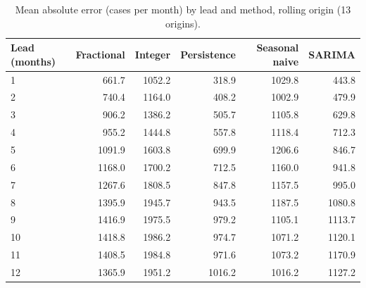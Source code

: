 \begin{table}[htbp]
\centering
\small
\caption{Mean absolute error (cases per month) by lead and method, rolling origin (13 origins).}
\label{tab:mae_h}
\begingroup\setlength{\tabcolsep}{6pt}
\begin{tabular}{@{}lrrrrr@{}}
\toprule
Lead (months) & Fractional & Integer & Persistence & Seasonal naive & SARIMA \\
\midrule
1 & 661.7 & 1052.2 & 318.9 & 1029.8 & 443.8 \\
2 & 740.4 & 1164.0 & 408.2 & 1002.9 & 479.9 \\
3 & 906.2 & 1386.2 & 505.7 & 1105.8 & 629.8 \\
4 & 955.2 & 1444.8 & 557.8 & 1118.4 & 712.3 \\
5 & 1091.9 & 1603.8 & 699.9 & 1206.6 & 846.7 \\
6 & 1168.0 & 1700.2 & 712.5 & 1160.0 & 941.8 \\
7 & 1267.6 & 1808.5 & 847.8 & 1157.5 & 995.0 \\
8 & 1395.9 & 1945.7 & 943.5 & 1187.5 & 1080.8 \\
9 & 1416.9 & 1975.5 & 979.2 & 1105.1 & 1113.7 \\
10 & 1418.8 & 1986.2 & 974.7 & 1071.2 & 1120.1 \\
11 & 1408.5 & 1984.8 & 971.6 & 1073.2 & 1170.9 \\
12 & 1365.9 & 1951.2 & 1016.2 & 1016.2 & 1127.2 \\
\bottomrule
\end{tabular}
\endgroup
\end{table}
